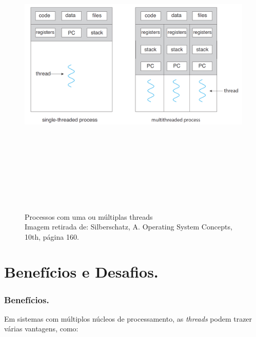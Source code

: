 \begin{figure}[h!]
\centering
\includegraphics[keepaspectratio, width=16cm, height=15cm]{imagens/06/06 - single threaded x multi threaded.png}
\caption{Processos com uma ou múltiplas threads   \\
Imagem retirada de: Silberschatz, A. Operating System Concepts, 10th,
página 160. \\}
\label{fig:Processos com uma ou múltiplas threads}
\end{figure}



\hypertarget{benefuxedcios-e-desafios.}{%
\section{Benefícios e Desafios.}\label{benefuxedcios-e-desafios.}}

\hypertarget{benefuxedcios.}{%
\subsubsection{Benefícios.}\label{benefuxedcios.}}

Em sistemas com múltiplos núcleos de processamento, as \emph{threads}
podem trazer várias vantagens, como:

